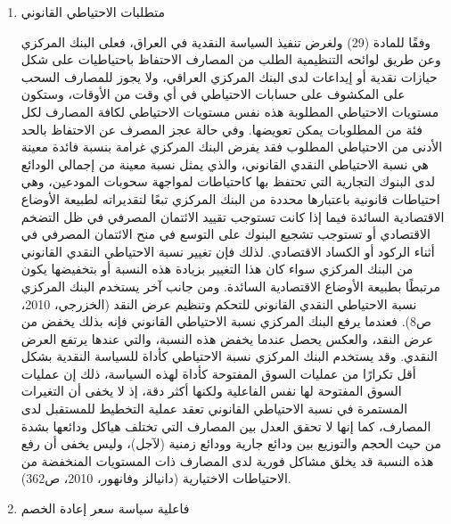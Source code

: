\documentclass[10pt,a4paper]{report}
\begin{document}
\begin{doublespacing}
\begin{enumerate}
	\begin{itemize}
		\item شراء أو بيع مباشر (فوري ولأجل) أو على أساس اتفاقيات إعادة الشراء أو أدوات مالية مشابهة أخرى، أوراق مالية صادرة عن البنك المركزي أو عن الحكومة تحمل عائدات سوقية.
		\item شراء أو بيع (فوري ولأجل) للنقد الأجنبي.
		\item خصم الحوالات أو السندات الإذنية.
		\item منح قروض مضمونة بالكامل بكفالات رهن.
		\item قبول ودائع تحمل فائدة للمصارف.
	\end{itemize}
	\item متطلبات الاحتياطي القانوني
	
وفقًا للمادة (29) ولغرض تنفيذ السياسة النقدية في العراق، فعلى البنك المركزي وعن طريق لوائحه التنظيمية الطلب من المصارف الاحتفاظ باحتياطيات على شكل حيازات نقدية أو إيداعات لدى البنك المركزي العراقي، ولا يجوز للمصارف السحب على المكشوف على حسابات الاحتياطي في أي وقت من الأوقات، وستكون مستويات الاحتياطي المطلوبة هذه نفس مستويات الاحتياطي لكافة المصارف لكل فئة من المطلوبات يمكن تعويضها. وفي حالة عجز المصرف عن الاحتفاظ بالحد الأدنى من الاحتياطي المطلوب فقد يفرض البنك المركزي غرامة بنسبة فائدة معينة هي نسبة الاحتياطي النقدي القانوني، والذي يمثل نسبة معينة من إجمالي الودائع لدى البنوك التجارية التي تحتفظ بها كاحتياطات لمواجهة سحوبات المودعين، وهي احتياطات قانونية باعتبارها محددة من البنك المركزي تبعًا لتقديراته لطبيعة الأوضاع الاقتصادية السائدة فيما إذا كانت تستوجب تقييد الائتمان المصرفي في ظل التضخم الاقتصادي أو تستوجب تشجيع البنوك على التوسع في منح الائتمان المصرفي في أثناء الركود أو الكساد الاقتصادي. لذلك فإن تغيير نسبة الاحتياطي النقدي القانوني من البنك المركزي سواء كان هذا التغيير بزيادة هذه النسبة أو بتخفيضها يكون مرتبطًا بطبيعة الأوضاع الاقتصادية السائدة. ومن جانب آخر يستخدم البنك المركزي نسبة الاحتياطي النقدي القانوني للتحكم وتنظيم عرض النقد ({الخزرجي، 2010، ص8}). فعندما يرفع البنك المركزي نسبة الاحتياطي القانوني فإنه بذلك يخفض من عرض النقد، والعكس يحصل عندما يخفض هذه النسبة، والتي عندها يرتفع العرض النقدي. وقد يستخدم البنك المركزي نسبة الاحتياطي كأداة للسياسة النقدية بشكل أقل تكرارًا من عمليات السوق المفتوحة كأداة لهذه السياسة، ذلك إن عمليات السوق المفتوحة لها نفس الفاعلية ولكنها أكثر دقة، إذ لا يخفى أن التغيرات المستمرة في نسبة الاحتياطي القانوني تعقد عملية التخطيط للمستقبل لدى المصارف، كما إنها لا تحقق العدل بين المصارف التي تختلف هياكل ودائعها بشدة من حيث الحجم والتوزيع بين ودائع جارية وودائع زمنية (لآجل)، وليس يخفى أن رفع هذه النسبة قد يخلق مشاكل فورية لدى المصارف ذات المستويات المنخفضة من الاحتياطات الاختيارية ({دانيالز وفانهور، 2010، ص362}).
\item فاعلية سياسة سعر إعادة الخصم


\end{enumerate}
\end{doublespacing}
\end{document}
